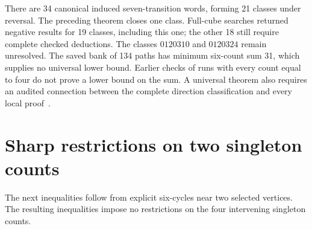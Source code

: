 \documentclass[11pt,a4paper]{article}
\theoremstyle{definition}
\theoremstyle{remark}
\begin{document}
There are 34 canonical induced seven-transition words, forming 21 classes
under reversal. The preceding theorem closes one class. Full-cube searches
returned negative results for 19 classes, including this one; the other
18 still require complete checked deductions. The classes $0120310$ and
$0120324$ remain unresolved. The saved bank of 134 paths has minimum
six-count sum 31, which supplies no universal lower bound. Earlier checks
of runs with every count equal to four do not prove a lower bound on the
sum. A universal theorem also requires an audited connection between the
complete direction classification and every local proof~\cite{uniformsixarchive}.

\section{Sharp restrictions on two singleton counts}\label{sec:distance-three-pair}
The next inequalities follow from explicit six-cycles near two selected vertices. The resulting inequalities impose no restrictions on the four intervening singleton counts.
\end{document}
